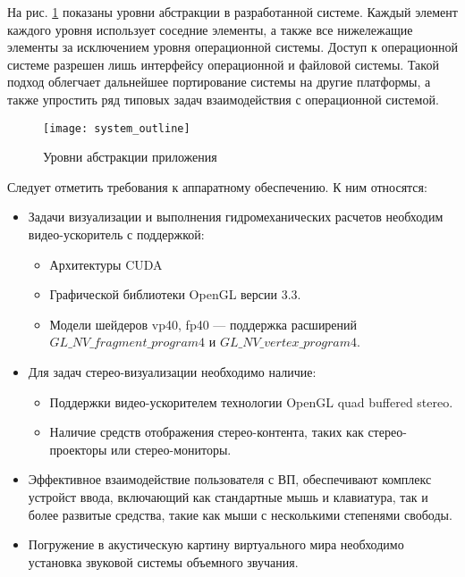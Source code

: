 На рис. \ref{ship_dfd} показаны уровни абстракции в разработанной системе. 
Каждый элемент каждого уровня использует соседние элементы, а также все нижележащие элементы за исключением уровня операционной системы. Доступ к операционной системе разрешен лишь интерфейсу операционной и файловой системы. Такой подход облегчает дальнейшее портирование системы на другие платформы, а также упростить ряд типовых задач взаимодействия с операционной системой.

\begin{figure}[ht]
	\begin{center}
	\texttt{[image: system\_outline]}
	\end{center}
	\caption{Уровни абстракции приложения}
	\label{ship_dfd}
\end{figure}

Следует отметить требования к аппаратному обеспечению. К ним относятся:
\begin{itemize}
	\item	Задачи визуализации и выполнения гидромеханических расчетов необходим 
	видео-ускоритель с поддержкой:
		\begin{itemize}
			\item	Архитектуры CUDA
			\item	Графической библиотеки OpenGL версии 3.3.
			\item	Модели шейдеров  vp40, fp40 --- поддержка расширений \linebreak
			$GL\_NV\_fragment\_program4$ и $GL\_NV\_vertex\_program4$.
		\end{itemize}
	\item	Для задач стерео-визуализации необходимо наличие:
		\begin{itemize}
			\item	Поддержки видео-ускорителем технологии OpenGL quad buffered stereo.
			\item	Наличие средств отображения стерео-контента, 
					таких как стерео-проекторы или стерео-мониторы.
		\end{itemize}	
	\item	Эффективное взаимодействие пользователя с ВП, обеспечивают комплекс устройст ввода, включающий как стандартные мышь и клавиатура, так и более развитые средства, такие как мыши с несколькими степенями свободы.
	\item 	Погружение в акустическую картину виртуального мира необходимо установка звуковой системы объемного звучания. 
\end{itemize}

